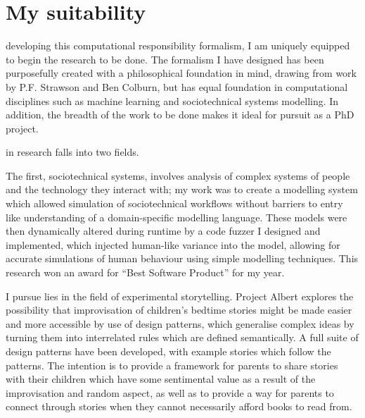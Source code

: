 \section{My suitability}

 developing this computational responsibility formalism, I am uniquely equipped to begin the research to be done. The formalism I have designed has been purposefully created with a philosophical foundation in mind, drawing from work by P.F. Strawson\cite{freedomandresentment} and Ben Colburn, but has equal foundation in computational disciplines such as machine learning and sociotechnical systems modelling\cite{sommerville_resp_depend}. In addition, the breadth of the work to be done makes it ideal for pursuit as a PhD project.\par

 in research falls into two fields. \par

The first, sociotechnical systems, involves analysis of complex systems of people and the technology they interact with; my work was to create a modelling system which allowed simulation of sociotechnical workflows without barriers to entry like understanding of a domain-specific modelling language. These models were then dynamically altered during runtime by a code fuzzer I designed and implemented, which injected human-like variance into the model, allowing for accurate simulations of human behaviour using simple modelling techniques. This research won an award for ``Best Software Product'' for my year.\par

 I pursue lies in the field of experimental storytelling. Project Albert explores the possibility that improvisation of children's bedtime stories might be made easier and more accessible by use of design patterns, which generalise complex ideas by turning them into interrelated rules which are defined semantically. A full suite of design patterns have been developed, with example stories which follow the patterns. The intention is to provide a framework for parents to share stories with their children which have some sentimental value as a result of the improvisation and random aspect, as well as to provide a way for parents to connect through stories when they cannot necessarily afford books to read from. 




